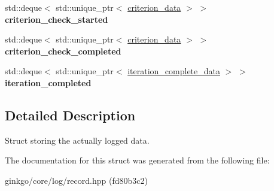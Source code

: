 \begin{DoxyCompactItemize}
\item 
\mbox{\label{structgko_1_1log_1_1Record_1_1logged__data_abfe68110796c0a094c937d3a8787cc04}} 
std\+::deque$<$ std\+::unique\+\_\+ptr$<$ \hyperlink{structgko_1_1log_1_1criterion__data}{criterion\+\_\+data} $>$ $>$ {\bfseries criterion\+\_\+check\+\_\+started}
\item 
\mbox{\label{structgko_1_1log_1_1Record_1_1logged__data_abf13cae8d7e797ae6c2b4ddf9a9cb33a}} 
std\+::deque$<$ std\+::unique\+\_\+ptr$<$ \hyperlink{structgko_1_1log_1_1criterion__data}{criterion\+\_\+data} $>$ $>$ {\bfseries criterion\+\_\+check\+\_\+completed}
\item 
\mbox{\label{structgko_1_1log_1_1Record_1_1logged__data_a54f71b0aecebe7a7957eb5cfba7395e3}} 
std\+::deque$<$ std\+::unique\+\_\+ptr$<$ \hyperlink{structgko_1_1log_1_1iteration__complete__data}{iteration\+\_\+complete\+\_\+data} $>$ $>$ {\bfseries iteration\+\_\+completed}
\end{DoxyCompactItemize}


\subsection{Detailed Description}
Struct storing the actually logged data. 

The documentation for this struct was generated from the following file\+:\begin{DoxyCompactItemize}
\item 
ginkgo/core/log/record.\+hpp (fd80b3c2)\end{DoxyCompactItemize}
